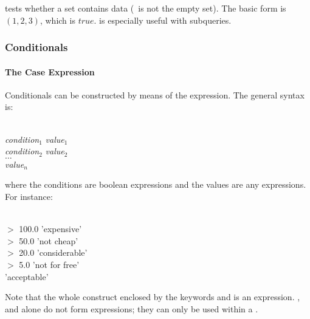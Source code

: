  tests whether a set contains
data (\ie\ is not the empty set).
The basic form is  $(1,2,3)$,
which is $true$.
 is especially useful with subqueries.

\subsubsection{Conditionals}
\paragraph{The Case Expression}
Conditionals can be constructed by means
of the  expression.
The general syntax is:

\\
\hspace*{1cm} \textit{condition$_1$} 
 \textit{value$_1$} \\
\hspace*{1cm} \textit{condition$_2$} 
 \textit{value$_2$} \\
\hspace*{1cm} $\dots$\\
\hspace*{1cm} \textit{value$_n$} \\

where the conditions are boolean expressions
and the values are any expressions.
For instance:

\\
\hspace*{1cm}  $>$ 100.0
 'expensive' \\
\hspace*{1cm}  $>$ 50.0
 'not cheap' \\
\hspace*{1cm}  $>$ 20.0
 'considerable' \\
\hspace*{1cm}  $>$ 5.0
 'not for free' \\
\hspace*{1cm} 'acceptable' \\

Note that the whole construct enclosed by
the keywords  and 
is an expression. , 
and  alone do not form expressions;
they can only be used within a .

